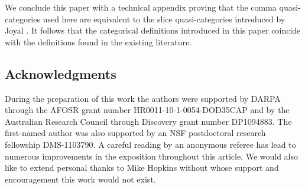 We conclude this paper with a technical appendix proving that the comma quasi-categories used here are equivalent to the slice quasi-categories introduced by Joyal \cite{Joyal:2002:QuasiCategories}. It follows that the categorical definitions introduced in this paper coincide with the definitions found in the existing literature.

\subsection{Acknowledgments}

During the preparation of this work the authors were supported by DARPA through the AFOSR grant number HR0011-10-1-0054-DOD35CAP and by the Australian Research Council through Discovery grant number DP1094883. The first-named author was also supported by an NSF postdoctoral research fellowship DMS-1103790. A careful reading by an anonymous referee has lead to numerous improvements in the exposition throughout this article. We would also like to extend personal thanks to Mike Hopkins without whose support and encouragement this work would not exist.


